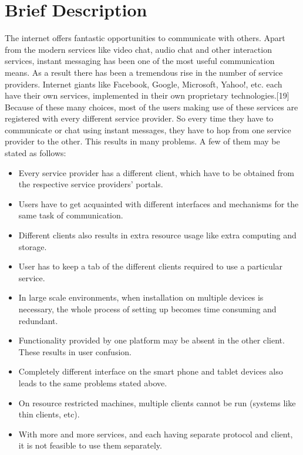 \documentclass{SureshLimkar}
\begin{document}
\section{Brief Description}
\hspace{0.5 in}The internet offers fantastic opportunities to communicate with others. Apart from the modern services like video chat, audio chat and other interaction services, instant messaging has been one of the most useful communication means. As a result there has been a tremendous rise in the number of service providers. Internet giants like Facebook, Google, Microsoft, Yahoo!, etc. each have their own services, implemented in their own proprietary technologies.[19]  Because of these many choices, most of the users making use of these services are registered with every different service provider. So every time they have to communicate or chat using instant messages, they have to hop from one service provider to the other. This results in many problems. A few of them may be stated as follows:
\\
\begin{itemize}
	\item Every service provider has a different client, which have to be obtained from the respective service providers' portals.
\item Users have to get acquainted with different interfaces and mechanisms for the same task of communication.
\item Different clients also results in extra resource usage like extra computing and storage.
\item User has to keep a tab of the different clients required to use a particular service.
\item In large scale environments, when installation on multiple devices is necessary, the whole process of setting up becomes time 	consuming and redundant.
\item Functionality provided by one platform may be absent in the other client. These results in user confusion.
\item Completely different interface on the smart phone and tablet devices also leads to the same problems stated above.
\item On resource restricted machines, multiple clients cannot be run (systems like thin clients, etc).
\item With more and more services, and each having separate protocol and client, it is not feasible to use them separately.
\end{itemize}
\newpage
\end{document}
